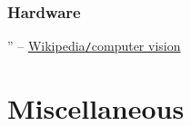 \documentclass{article}
\begin{document}
\subsubsection{Hardware}

'' -- \href{https://en.wikipedia.org/wiki/Computer_vision}{Wikipedia{\tt/}computer vision}


\section{Miscellaneous}


\printbibliography[heading=bibintoc]
	
\end{document}
